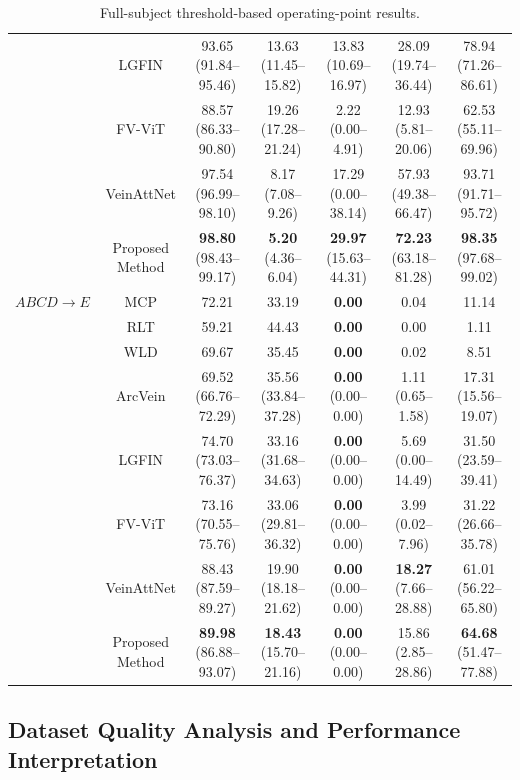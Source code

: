 \documentclass[10pt,journal,compsoc]{IEEEtran}
\begin{document}
\begin{table}[ht!]
{\begin{tabular}{|c|c|c|c|c|c|c|}
         & LGFIN \cite{lgfin} & 93.65 (91.84--95.46) & 13.63 (11.45--15.82) & 13.83 (10.69--16.97) & 28.09 (19.74--36.44) & 78.94 (71.26--86.61) \\
         & FV-ViT \cite{vit} & 88.57 (86.33--90.80) & 19.26 (17.28--21.24) & 2.22 (0.00--4.91) & 12.93 (5.81--20.06) & 62.53 (55.11--69.96) \\
         & VeinAttNet \cite{veinatnnet} & 97.54 (96.99--98.10) & 8.17 (7.08--9.26) & 17.29 (0.00--38.14) & 57.93 (49.38--66.47) & 93.71 (91.71--95.72) \\
         & Proposed Method & \textbf{98.80} (98.43--99.17) & \textbf{5.20} (4.36--6.04) & \textbf{29.97} (15.63--44.31) & \textbf{72.23} (63.18--81.28) & \textbf{98.35} (97.68--99.02) \\
        \hline
        $ABCD \rightarrow E$ & MCP \cite{mcp} & 72.21 & 33.19 & \textbf{0.00} & 0.04 & 11.14 \\
         & RLT \cite{rlt} & 59.21 & 44.43 & \textbf{0.00} & 0.00 & 1.11 \\
         & WLD \cite{wld} & 69.67 & 35.45 & \textbf{0.00} & 0.02 & 8.51 \\
         & ArcVein \cite{arcvein} & 69.52 (66.76--72.29) & 35.56 (33.84--37.28) & \textbf{0.00} (0.00--0.00) & 1.11 (0.65--1.58) & 17.31 (15.56--19.07) \\
         & LGFIN \cite{lgfin} & 74.70 (73.03--76.37) & 33.16 (31.68--34.63) & \textbf{0.00} (0.00--0.00) & 5.69 (0.00--14.49) & 31.50 (23.59--39.41) \\
         & FV-ViT \cite{vit} & 73.16 (70.55--75.76) & 33.06 (29.81--36.32) & \textbf{0.00} (0.00--0.00) & 3.99 (0.02--7.96) & 31.22 (26.66--35.78) \\
         & VeinAttNet \cite{veinatnnet} & 88.43 (87.59--89.27) & 19.90 (18.18--21.62) & \textbf{0.00} (0.00--0.00) & \textbf{18.27} (7.66--28.88) & 61.01 (56.22--65.80) \\
         & Proposed Method & \textbf{89.98} (86.88--93.07) & \textbf{18.43} (15.70--21.16) & \textbf{0.00} (0.00--0.00) & 15.86 (2.85--28.86) & \textbf{64.68} (51.47--77.88) \\
        \hline
    \end{tabular}}
    \caption{Full-subject threshold-based operating-point results.}
    \label{tab:rebuttal_full_thresholds}
\end{table}



\subsection{Dataset Quality Analysis and Performance Interpretation}
\label{sec:dataset_quality_analysis}
\end{document}
